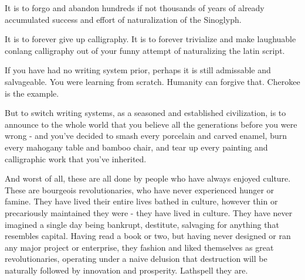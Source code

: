 It is to forgo and abandon hundreds if not thousands of years of already accumulated success and effort of naturalization of the Sinoglyph. 

It is to forever give up calligraphy. It is to forever trivialize and make laughuable conlang calligraphy out of your funny attempt of naturalizing the latin script.

If you have had no writing system prior, perhaps it is still admissable and salvageable. You were learning from scratch. Humanity can forgive that. Cherokee is the example. 

But to switch writing systems, as a seasoned and established civilization, is to announce to the whole world that you believe all the generations before you were wrong - and you've decided to smash every porcelain and carved enamel, burn every mahogany table and bamboo chair, and tear up every painting and calligraphic work that you've inherited. 

And worst of all, these are all done by people who have always enjoyed culture. These are bourgeois revolutionaries, who have never experienced hunger or famine. They have lived their entire lives bathed in culture, however thin or precariously maintained they were - they have lived in culture. They have never imagined a single day being bankrupt, destitute, salvaging for anything that resembles capital. Having read a book or two, but having never designed or ran any major project or enterprise, they fashion and liked themselves as great revolutionaries, operating under a naive delusion that destruction will be naturally followed by innovation and prosperity. Lathspell they are.



